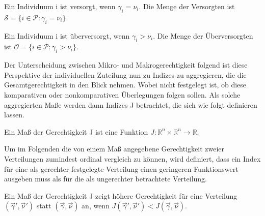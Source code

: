 \documentclass[a4paper]{thesis}
\begin{document}
\begin{Definition}[Versorgung]
Ein Individuum i ist versorgt, wenn $\gamma_i=\nu_i$. Die Menge der Versorgten ist $\mathcal{S}=\{i\in\mathcal{P}:\gamma_i=\nu_i\}$.
\end{Definition}

\begin{Definition}[Überversorgung]
Ein Individuum i ist überversorgt, wenn $\gamma_i>\nu_i$. Die Menge der Überversorgten ist $\mathcal{O}=\{i\in\mathcal{P}:\gamma_i>\nu_i\}$.
\end{Definition}

Der Unterscheidung zwischen Mikro- und Makrogerechtigkeit folgend ist diese Perspektive der individuellen Zuteilung nun zu Indizes zu aggregieren, die die Gesamtgerechtigkeit in den Blick nehmen. Wobei nicht festgelegt ist, ob diese komparativen oder nonkomparativen Überlegungen folgen sollen. Als solche aggregierten Maße werden dann Indizes J betrachtet, die sich wie folgt definieren lassen.

\begin{Definition}[Gerechtigkeitsmaß]
Ein Maß der Gerechtigkeit J ist eine Funktion $J:\mathbb{R}^{n}\times\mathbb{R}^{n}\rightarrow\mathbb{R}$.
\end{Definition}

Um im Folgenden die von einem Maß angegebene Gerechtigkeit zweier Verteilungen zumindest ordinal vergleich zu können, wird definiert, dass ein Index für eine als gerechter festgelegte Verteilung einen geringeren Funktionswert ausgeben muss als für die als ungerechter betrachtete Verteilung.

\begin{Definition}[Gerechtigkeitsordnung]
Ein Maß der Gerechtigkeit J zeigt höhere Gerechtigkeit für eine Verteilung $(\vec{\gamma}\prime,\vec{\nu}\prime)$ statt $(\vec{\gamma},\vec{\nu})$ an, wenn $J(\vec{\gamma}\prime,\vec{\nu}\prime)<J(\vec{\gamma},\vec{\nu})$. 
\end{Definition}
\end{document}

